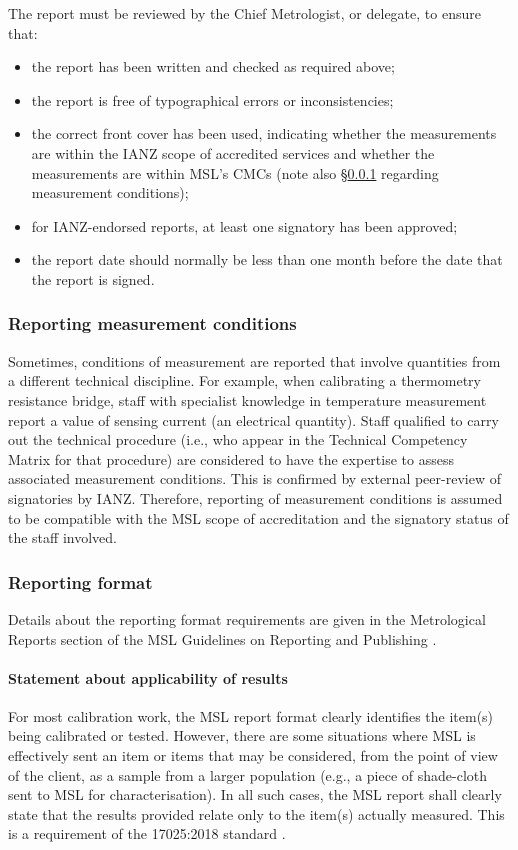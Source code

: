 The report must be reviewed by the Chief Metrologist, or delegate, to ensure that:
\begin{itemize}
\item the report has been written and checked as required above;
\item the report is free of typographical errors or inconsistencies;
\item the correct front cover has been used, indicating whether the measurements are within the IANZ scope of accredited services and whether the measurements are within MSL’s CMCs (note also \S\ref{sss:measurement_conditions} regarding measurement conditions);
\item for IANZ-endorsed reports, at least one signatory has been approved;
\item the report date should normally be less than one month before the date that the report is signed.
\end{itemize} 

\subsubsection{Reporting measurement conditions}
\label{sss:measurement_conditions}
Sometimes, conditions of measurement are reported that involve quantities from a different technical discipline. For example, when calibrating a thermometry resistance bridge, staff with specialist knowledge in temperature measurement report a value of sensing current (an electrical quantity). Staff qualified to carry out the technical procedure (i.e., who appear in the Technical Competency Matrix for that procedure) are considered to have the expertise to assess associated measurement conditions. This is confirmed by external peer-review of signatories by IANZ. Therefore, reporting of measurement conditions is assumed to be compatible with the MSL scope of accreditation and the signatory status of the staff involved.

\subsubsection{Reporting format}
Details about the reporting format requirements are given in the Metrological Reports section of the MSL Guidelines on Reporting and Publishing \cite{MSL_Reporting_Guidelines}.

\paragraph{Statement about applicability of results}
For most calibration work, the MSL report format clearly identifies the item(s) being calibrated or tested. However, there are some situations where MSL is effectively sent an item or items that may be considered, from the point of view of the client, as a sample from a larger population (e.g., a piece of shade-cloth sent to MSL for characterisation). In all such cases, the MSL report shall clearly state that the results provided relate only to the item(s) actually measured. This is a requirement of the 17025:2018 standard \cite[clause 7.8.2.1~(l)]{ISO_17025}.      

